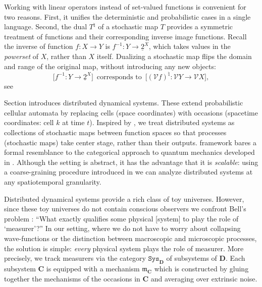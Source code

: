 \documentclass[12pt]{article}
\newcommand{\vecify}{{\mathcal V}}
\newcommand{\univ}{{\mathbf D}}
\newcommand{\mangle}{{\mathbf C}}
\newcommand{\subs}{{\mathtt{Sys}}}
\newcommand{\fm}{{\mathfrak m}}
\theoremstyle{remark}
\begin{document}
Working with linear operators instead of set-valued functions is convenient 
for two reasons. First, it unifies the deterministic and probabilistic cases
in a single language. Second, the dual $T^\natural$ of a stochastic map $T$ 
provides a symmetric treatment of functions and their corresponding inverse 
image functions. Recall the inverse of function $f:X\rightarrow Y$ is 
$f^{-1}:Y\rightarrow \underline{2}^X$, which takes values in the 
\emph{powerset} of $X$, rather than $X$ itself. Dualizing a stochastic map 
flips the domain and range of the original map, without introducing any new 
objects:
\begin{equation}
	\Big[f^{-1}:Y\rightarrow \underline{2}^X\Big]\,\mbox{ corresponds to }\,
	\Big[(\vecify f)^\natural:\vecify Y\rightarrow \vecify X\Big],
	\label{e:preimage-corr}
\end{equation}
see %

Section %
introduces distributed dynamical systems. These extend 
probabilistic cellular automata by replacing cells (space 
coordinates) with occasions (spacetime coordinates: cell $k$ 
at time $t$). Inspired by \cite{hooft:99, abramsky:09},  we 
treat distributed systems as collections of stochastic maps 
between function spaces so that processes (stochastic maps) 
take center stage, rather than their outputs. %
framework bares a formal resemblance to the categorical 
approach to quantum mechanics developed in \cite{abramsky:09}. 
Although the setting is abstract, it has the advantage that it 
is \emph{scalable}: using a coarse-graining procedure 
introduced in \cite{balduzzi:11} we can analyze distributed 
systems at any spatiotemporal granularity.

Distributed dynamical systems provide a rich class of toy 
universes. However, since these toy universes do not contain 
conscious observers we confront Bell's problem  \cite{bell:90}:
``What exactly qualifies some physical [system] to play the 
role of `measurer'?'' In our setting, where we do not have to 
worry about collapsing wave-functions or the distinction 
between macroscopic and microscopic processes, the solution is 
simple: \emph{every} physical system plays the role of 
measurer. More precisely, we track measurers via the 
category $\subs_\univ$ of subsystems of $\univ$. Each 
subsystem $\mangle$ is equipped with a mechanism $\fm_\mangle$ 
which is constructed by gluing together the mechanisms of the 
occasions in $\mangle$ and averaging over extrinsic noise.
\end{document}
